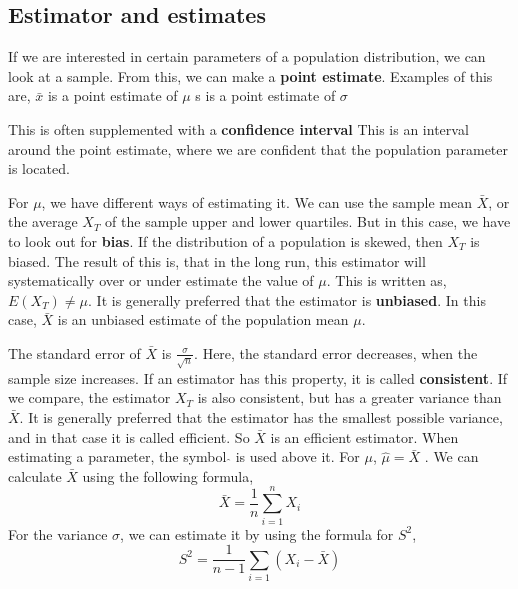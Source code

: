 \subsection{Estimator and estimates}
If we are interested in certain parameters of a population distribution, we can look at a sample. From this, we can make a \textbf{point estimate}. 
\newline
Examples of this are, 
\newline
$\bar{x}$ is a point estimate of $\mu$
\newline
s is a point estimate of $\sigma$
\newline

\noindent This is often supplemented with a \textbf{confidence interval}
\newline
This is an interval around the point estimate, where we are confident that the population parameter is located.
\newline

\noindent For $\mu$, we have different ways of estimating it. We can use the sample mean $\bar{X}$, or the average $X_T$ of the sample upper and lower quartiles. 
But in this case, we have to look out for \textbf{bias}. If the distribution of a population is skewed, then $X_T$ is biased. The result of this is, that in the long run, this estimator will systematically over or under estimate the value of $\mu$. This is written as,
\newline
$E(X_T) \neq \mu$.
\newline
It is generally preferred that the estimator is \textbf{unbiased}. In this case, $\bar{X}$ is an unbiased estimate of the population mean $\mu$.
\newline

\noindent The standard error of $\bar{X}$ is $\frac{\sigma}{\sqrt{n}}$. Here, the standard error decreases, when the sample size increases. If an estimator has this property, it is called \textbf{consistent}. If we compare, the estimator $X_T$ is also consistent, but has a greater variance than $\bar{X}$. 
\newline
It is generally preferred that the estimator has the smallest possible variance, and in that case it is called efficient. So $\bar{X}$ is an efficient estimator.
\newline
When estimating a parameter, the symbol $\hat{}$ is used above it. For $\mu$, $\hat{\mu} = \bar{X}$ .
\newline
We can calculate $\bar{X}$ using the following formula,
$$\bar{X}=\frac{1}{n} \sum_{i=1}^{n}X_i$$   
\newline
For the variance $\sigma$, we can estimate it by using the formula for $S^2$,
$$S^2=\frac{1}{n-1} \sum_{i=1}(X_i-\bar{X})$$
